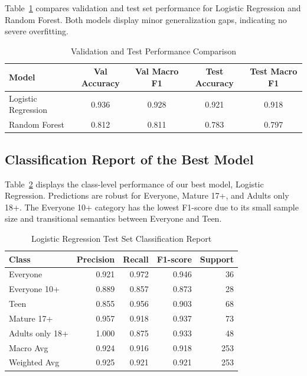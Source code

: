 \documentclass[11pt,a4paper]{article}
\begin{document}
Table~\ref{tab:val-test} compares validation and test set performance for Logistic Regression and Random Forest. Both models display minor generalization gaps, indicating no severe overfitting.

\begin{table}[H]
\centering
\caption{Validation and Test Performance Comparison}
\label{tab:val-test}
\renewcommand{\arraystretch}{1.25}
\begin{tabular}{lcccc}
\toprule
Model & Val Accuracy & Val Macro F1 & Test Accuracy & Test Macro F1 \\
\midrule
Logistic Regression & 0.936 & 0.928 & 0.921 & 0.918 \\
Random Forest & 0.812 & 0.811 & 0.783 & 0.797 \\
\bottomrule
\end{tabular}
\end{table}

\subsection{Classification Report of the Best Model}

Table~\ref{tab:lr-report} displays the class-level performance of our best model, Logistic Regression. Predictions are robust for Everyone, Mature 17+, and Adults only 18+. The Everyone 10+ category has the lowest F1-score due to its small sample size and transitional semantics between Everyone and Teen.

\begin{table}[H]
\centering
\caption{Logistic Regression Test Set Classification Report}
\label{tab:lr-report}
\renewcommand{\arraystretch}{1.25}
\begin{tabular}{lrrrr}
\toprule
Class & Precision & Recall & F1-score & Support \\
\midrule
Everyone & 0.921 & 0.972 & 0.946 & 36 \\
Everyone 10+ & 0.889 & 0.857 & 0.873 & 28 \\
Teen & 0.855 & 0.956 & 0.903 & 68 \\
Mature 17+ & 0.957 & 0.918 & 0.937 & 73 \\
Adults only 18+ & 1.000 & 0.875 & 0.933 & 48 \\
\midrule
Macro Avg & 0.924 & 0.916 & 0.918 & 253 \\
Weighted Avg & 0.925 & 0.921 & 0.921 & 253 \\
\bottomrule
\end{tabular}
\end{table}
\end{document}
